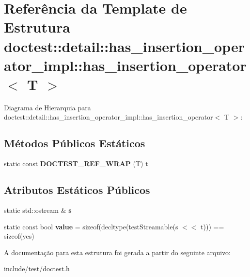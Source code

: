 \hypertarget{structdoctest_1_1detail_1_1has__insertion__operator__impl_1_1has__insertion__operator}{}\section{Referência da Template de Estrutura doctest\+:\+:detail\+:\+:has\+\_\+insertion\+\_\+operator\+\_\+impl\+:\+:has\+\_\+insertion\+\_\+operator$<$ T $>$}
\label{structdoctest_1_1detail_1_1has__insertion__operator__impl_1_1has__insertion__operator}


Diagrama de Hierarquia para doctest\+:\+:detail\+:\+:has\+\_\+insertion\+\_\+operator\+\_\+impl\+:\+:has\+\_\+insertion\+\_\+operator$<$ T $>$\+:
\subsection*{Métodos Públicos Estáticos}
\begin{DoxyCompactItemize}
\item 
\mbox{\label{structdoctest_1_1detail_1_1has__insertion__operator__impl_1_1has__insertion__operator_a1fb02db021f0e6039e11df088f47ae4f}} 
static const {\bfseries D\+O\+C\+T\+E\+S\+T\+\_\+\+R\+E\+F\+\_\+\+W\+R\+AP} (T) t
\end{DoxyCompactItemize}
\subsection*{Atributos Estáticos Públicos}
\begin{DoxyCompactItemize}
\item 
\mbox{\label{structdoctest_1_1detail_1_1has__insertion__operator__impl_1_1has__insertion__operator_abdd586daed17058bb6d08adc796802f0}} 
static std\+::ostream \& {\bfseries s}
\item 
\mbox{\label{structdoctest_1_1detail_1_1has__insertion__operator__impl_1_1has__insertion__operator_a8e8e9abdead07386f3d1f16bbca64986}} 
static const bool {\bfseries value} = sizeof(decltype(test\+Streamable(s $<$$<$ t))) == sizeof(yes)
\end{DoxyCompactItemize}


A documentação para esta estrutura foi gerada a partir do seguinte arquivo\+:\begin{DoxyCompactItemize}
\item 
include/test/doctest.\+h\end{DoxyCompactItemize}
